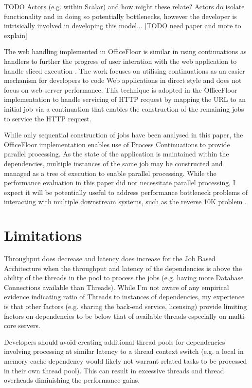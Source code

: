\documentclass[conference]{ieee/IEEEtran}
\begin{document}
TODO Actors (e.g. within Scalar) and how might these relate?  Actors do isolate
functionality and in doing so potentially bottlenecks, however the developer is
intrisically involved in developing this model...   [TODO need paper and more
to explain]
   
The web handling implemented in OfficeFloor is similar in using continuations
as handlers to further the progress of user interation with the web application
to handle sliced execution \cite{url-continuation}.  The work focuses on utilising
continuations as an easier mechanism for developers to code Web applications in
direct style and does not focus on web server performance.  This technique is
adopted in the OfficeFloor implementation to handle servicing of HTTP request
by mapping the URL to an initial job via a continuation that enables the
construction of the remaining jobs to service the HTTP request.

While only sequential construction of jobs have been analysed in this paper, the
OfficeFloor implementation enables use of Process Continuations
\cite{process-continuation} to provide parallel processing.  As the state
of the application is maintained within the dependencies, multiple instances of
the same job may be constructed and managed as a tree of execution to enable
parallel processing.  While the performance evaluation in this paper did not
necessitate parallel processing, I expect it will be potentially useful to
address performance bottleneck problems of interacting with multiple downstream
systems, such as the reverse 10K problem \cite{reverse-ten-k-problem}.
   

\section{Limitations}
Throughput does decrease and latency does increase for the Job Based
Architecture when the throughput and latency of the dependencies is above the
ability of the threads in the pool to process the jobs (e.g. having more
Database Connections available than Threads).  While I'm not aware of any
empirical evidence indicating ratio of Threads to instances of dependencies, my
experience is that other factors (e.g. sharing the back-end service, licensing)
provide limiting factors on dependencies to be below that of available threads
especially on multi-core servers.

Developers should avoid creating additional thread pools for dependencies
involving processing at similar latency to a thread context switch (e.g. a
local in memory cache dependency would likely not warrant related tasks to be
processed in their own thread pool).  This can result in excessive threads and
thread overheads diminishing the performance gains.
\end{document}
